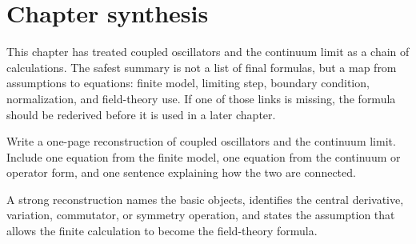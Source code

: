 \section{Chapter synthesis}

This chapter has treated coupled oscillators and the continuum limit as a chain of calculations.  The safest summary is not a list of final formulas, but a map from assumptions to equations: finite model, limiting step, boundary condition, normalization, and field-theory use.  If one of those links is missing, the formula should be rederived before it is used in a later chapter.

\begin{exercise}
Write a one-page reconstruction of coupled oscillators and the continuum limit.  Include one equation from the finite model, one equation from the continuum or operator form, and one sentence explaining how the two are connected.
\begin{answer}
A strong reconstruction names the basic objects, identifies the central derivative, variation, commutator, or symmetry operation, and states the assumption that allows the finite calculation to become the field-theory formula.
\end{answer}
\end{exercise}
